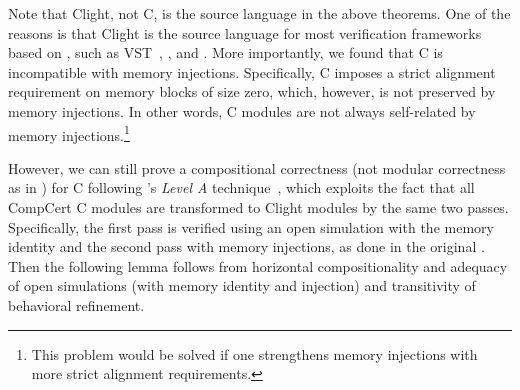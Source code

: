 Note that \textrm{Clight}, not \textrm{\cc{} C}, is the source language in the above theorems.  One of the
reasons is that \textrm{Clight} is the source language for most verification frameworks based on
\cc{}, such as VST~\cite{VST}, \ccc{}, and \ccx{}.  More importantly, we found that
\textrm{\cc{} C} is incompatible with memory injections.  Specifically,
\textrm{\cc{} C} imposes a strict alignment requirement on memory blocks of size zero, which, however,
is not preserved by memory injections.
In other words, \textrm{\cc{} C} modules are not always self-related by memory injections.\footnote{This problem
  would be solved if one strengthens memory injections with more strict alignment requirements.}

However, we can still prove a compositional correctness (not modular correctness as in ) for \textrm{\cc{} C}
following \scc{}'s \emph{Level A} technique~\cite{kang:scc},
which exploits the fact that all \textrm{CompCert C} modules are transformed to \textrm{Clight} modules
by the same two passes.
Specifically, the first pass is verified using an open simulation with the memory identity
and the second pass with memory injections, as done in the original \cc{}.
Then the following lemma follows from horizontal compositionality and adequacy of
open simulations (with memory identity and injection) and transitivity of behavioral refinement.

